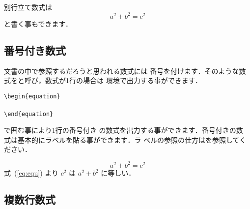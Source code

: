 \begin{InOut}
別行立て数式は
\begin{displaymath}
     a^2 + b^2 = c^2
\end{displaymath}
と書く事もできます．
\end{InOut}



%
\subsection{番号付き数式}%
文書の中で参照するだろうと思われる数式には
番号を付けます．そのような数式を{}と呼び，数式が1行の場合は
環境で出力する事ができます．
\begin{Syntax}
\verb+\begin{equation}+\\
 \\
\verb+\end{equation}+
\end{Syntax}
で囲む事により1行の番号付き
の数式を出力する事ができます．番号付きの数
式は基本的にラベルを貼る事ができます．ラ
ベルの参照の仕方はを参照してください．
\begin{InOut}
\begin{equation}
 a^2 + b^2 = c^2  \label{eq:equ}
\end{equation}
式~(\ref{eq:equ}) より $c^2$ は 
$a^2+b^2$ に等しい．
\end{InOut}
\subsection{複数行数式}

